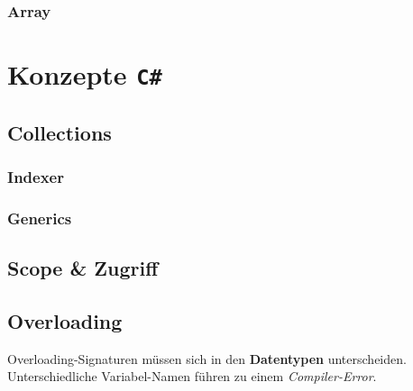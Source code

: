 \documentclass[
  9pt,
  a4paperpaper,
  DIV=11]{scrartcl}
\numberwithin{equation}{section}
\begin{document}
\begin{multicols}{2}
\hypertarget{array}{%
\subsubsection{Array}\label{array}}

\hypertarget{konzepte-c}{%
\section{\texorpdfstring{Konzepte
\texttt{C\#}}{Konzepte C\#}}\label{konzepte-c}}

\hypertarget{collections}{%
\subsection{Collections}\label{collections}}

\hypertarget{indexer}{%
\subsubsection{Indexer}\label{indexer}}

\hypertarget{generics}{%
\subsubsection{Generics}\label{generics}}

\hypertarget{scope-zugriff}{%
\subsection{Scope \& Zugriff}\label{scope-zugriff}}

\hypertarget{overloading}{%
\subsection{Overloading}\label{overloading}}

\begin{tcolorbox}[enhanced jigsaw, breakable, colbacktitle=quarto-callout-important-color!10!white, bottomtitle=1mm, toptitle=1mm, opacitybacktitle=0.6, colback=white, rightrule=.15mm, title=\textcolor{quarto-callout-important-color}{\faExclamation}\hspace{0.5em}{Wichtig}, toprule=.15mm, coltitle=black, colframe=quarto-callout-important-color-frame, titlerule=0mm, arc=.35mm, bottomrule=.15mm, leftrule=.75mm, left=2mm, opacityback=0]

Overloading-Signaturen müssen sich in den \textbf{Datentypen}
unterscheiden. Unterschiedliche Variabel-Namen führen zu einem
\emph{Compiler-Error}.


\end{tcolorbox}
\end{multicols}
\end{document}
